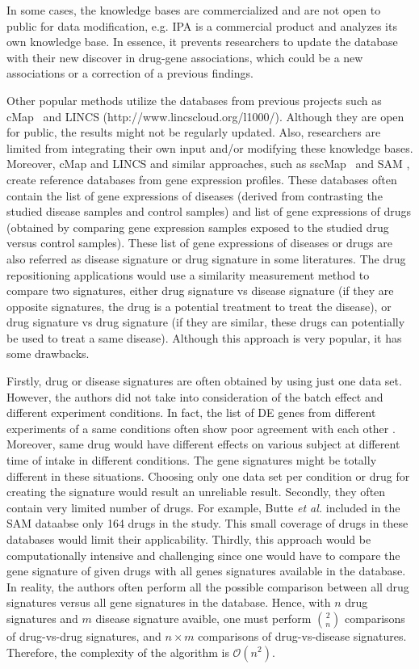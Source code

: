 \documentclass[Minh_PhD_thesis.tex]{subfiles}
\begin{document}
In some cases, the knowledge bases are commercialized and are not open to public for data modification, e.g. IPA is a commercial product and analyzes its own knowledge base. In essence, it prevents researchers to update the database with their new discover in drug-gene associations, which could be a new associations or a correction of a previous findings. 


Other popular methods utilize the databases from previous projects such as cMap~\cite{lamb2007connectivity, lamb2006connectivity} and LINCS (http://www.lincscloud.org/l1000/). Although they are open for public, the results might not be regularly updated. Also, researchers are limited from integrating their own input and/or modifying these knowledge bases. 
Moreover, cMap and LINCS and similar approaches, such as sscMap~\cite{zhang2009sscmap} and SAM \cite{sirota2011discovery}, create reference databases from gene expression profiles. These databases often contain the list of gene expressions of diseases (derived from contrasting the studied disease  samples and control samples) and list of gene expressions of drugs (obtained by comparing gene expression samples exposed to the studied drug versus control samples). These list of gene expressions of diseases or drugs are also referred as disease signature or drug signature in some literatures. The drug repositioning applications would use a similarity measurement method to compare two signatures, either drug signature vs disease signature (if they are opposite signatures, the drug is a potential treatment to treat the disease), or drug signature vs drug signature (if they are similar, these drugs can potentially be used to treat a same disease). Although this approach is very popular, it has some drawbacks. 

Firstly, drug or disease signatures are often obtained by using just one data set. However, the authors did not take into consideration of the batch effect and different experiment conditions. In fact, the list of DE genes from different experiments of a same conditions often show poor agreement with each other \cite{ein2005outcome}. Moreover, same drug would have different effects on various subject at different time of intake in different conditions. The gene signatures might be totally different in these situations.
Choosing only one data set per condition or drug for creating the signature would result an unreliable result.
Secondly, they often contain very limited number of drugs. For example, Butte \textit{et al.} included in the SAM dataabse only 164 drugs in the study. This small coverage of drugs in these databases would limit their applicability.
Thirdly,  this approach would be computationally intensive and challenging since one would have to compare the gene signature of given drugs with all genes signatures available in the database. In reality, the authors often perform all the  possible comparison between all drug signatures versus all gene signatures in the database. Hence, with $n$ drug signatures and $m$ disease signature avaible, one must perform $\binom 2n$ comparisons of drug-vs-drug signatures, and $n \times m$ comparisons of drug-vs-disease signatures.  Therefore, the complexity of the algorithm is $\mathcal{O}(n^2)$.
\end{document}
